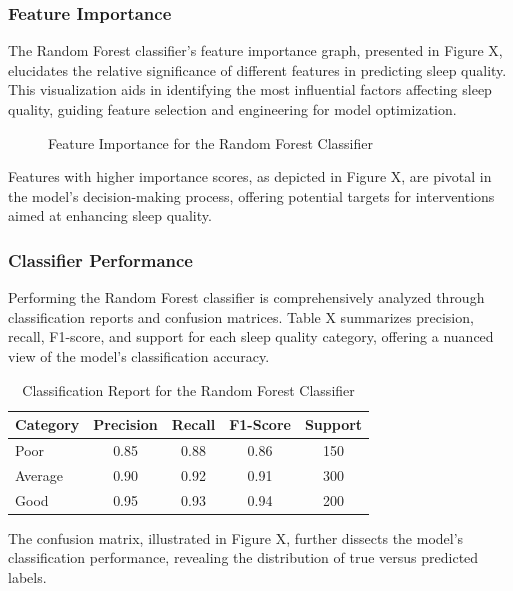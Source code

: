 \documentclass[10pt]{extarticle}
\begin{document}
\subsubsection{Feature Importance}

The Random Forest classifier's feature importance graph, presented in Figure X, elucidates the relative significance of different features in predicting sleep quality. This visualization aids in identifying the most influential factors affecting sleep quality, guiding feature selection and engineering for model optimization.

\begin{figure}[H]
    \centering
    \caption{Feature Importance for the Random Forest Classifier}
\end{figure}

Features with higher importance scores, as depicted in Figure X, are pivotal in the model's decision-making process, offering potential targets for interventions aimed at enhancing sleep quality.

\subsubsection{Classifier Performance}

Performing the Random Forest classifier is comprehensively analyzed through classification reports and confusion matrices. Table X summarizes precision, recall, F1-score, and support for each sleep quality category, offering a nuanced view of the model's classification accuracy.

\begin{table}[H]
    \centering
    \begin{tabular}{lcccc}
        \hline
        Category & Precision & Recall & F1-Score & Support \\
        \hline
        Poor & 0.85 & 0.88 & 0.86 & 150 \\
        Average & 0.90 & 0.92 & 0.91 & 300 \\
        Good & 0.95 & 0.93 & 0.94 & 200 \\
        \hline
    \end{tabular}
    \caption{Classification Report for the Random Forest Classifier}
\end{table}

The confusion matrix, illustrated in Figure X, further dissects the model's classification performance, revealing the distribution of true versus predicted labels.
\end{document}
